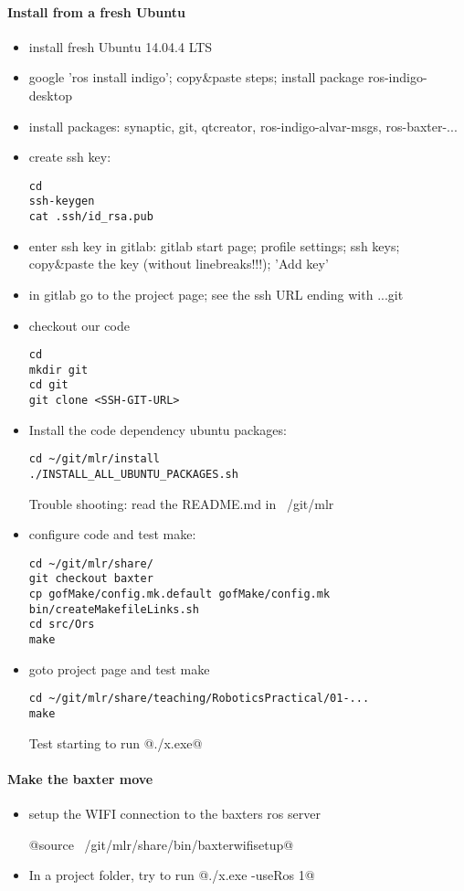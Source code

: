 \documentclass[10pt,fleqn,twoside]{article}
\begin{document}
\paragraph{Install from a fresh Ubuntu}
\begin{itemize}
\item install fresh Ubuntu 14.04.4 LTS
\item google 'ros install indigo'; copy\&paste steps; install package
  ros-indigo-desktop
\item install packages: synaptic, git, qtcreator,
  ros-indigo-alvar-msgs, ros-baxter-...
\item create ssh key:
\begin{Verbatim}
cd
ssh-keygen
cat .ssh/id_rsa.pub
\end{Verbatim}
\item enter ssh key in gitlab: gitlab start page; profile settings;
  ssh keys; copy\&paste the key (without linebreaks!!!); 'Add key'
\item in gitlab go to the project page; see the ssh URL ending with ...git
\item checkout our code
\begin{Verbatim}
cd
mkdir git
cd git
git clone <SSH-GIT-URL>
\end{Verbatim}
\item Install the code dependency ubuntu packages: 
\begin{Verbatim}
cd ~/git/mlr/install
./INSTALL_ALL_UBUNTU_PACKAGES.sh
\end{Verbatim}
Trouble shooting: read the README.md in ~/git/mlr
\item configure code and test make:
\begin{Verbatim}
cd ~/git/mlr/share/
git checkout baxter
cp gofMake/config.mk.default gofMake/config.mk
bin/createMakefileLinks.sh
cd src/Ors
make
\end{Verbatim}
\item goto project page and test make
\begin{Verbatim}
cd ~/git/mlr/share/teaching/RoboticsPractical/01-...
make
\end{Verbatim}
Test starting to run @./x.exe@
\end{itemize}

\paragraph{Make the baxter move}
\begin{itemize}
\item setup the WIFI connection to the baxters ros server

@source ~/git/mlr/share/bin/baxterwifisetup@

\item In a project folder, try to run @./x.exe -useRos 1@
\end{itemize}
\end{document}
